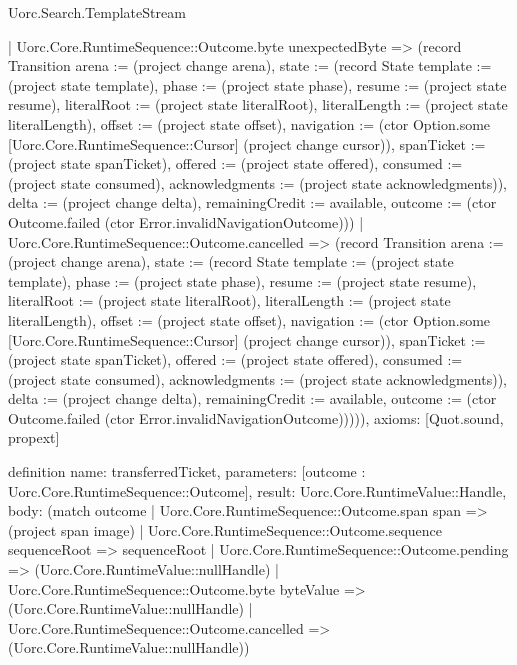 \begin{lexlean}{Uorc.Search.TemplateStream}
\begin{semanticmodule}
{      | Uorc.Core.RuntimeSequence::Outcome.byte unexpectedByte => (record Transition {arena := (project change arena), state := (record State {template := (project state template), phase := (project state phase), resume := (project state resume), literalRoot := (project state literalRoot), literalLength := (project state literalLength), offset := (project state offset), navigation := (ctor Option.some [Uorc.Core.RuntimeSequence::Cursor] (project change cursor)), spanTicket := (project state spanTicket), offered := (project state offered), consumed := (project state consumed), acknowledgments := (project state acknowledgments)}), delta := (project change delta), remainingCredit := available, outcome := (ctor Outcome.failed (ctor Error.invalidNavigationOutcome))})
      | Uorc.Core.RuntimeSequence::Outcome.cancelled => (record Transition {arena := (project change arena), state := (record State {template := (project state template), phase := (project state phase), resume := (project state resume), literalRoot := (project state literalRoot), literalLength := (project state literalLength), offset := (project state offset), navigation := (ctor Option.some [Uorc.Core.RuntimeSequence::Cursor] (project change cursor)), spanTicket := (project state spanTicket), offered := (project state offered), consumed := (project state consumed), acknowledgments := (project state acknowledgments)}), delta := (project change delta), remainingCredit := available, outcome := (ctor Outcome.failed (ctor Error.invalidNavigationOutcome))}))),
  axioms: [Quot.sound, propext]
}

definition{
  name: transferredTicket,
  parameters: [outcome : Uorc.Core.RuntimeSequence::Outcome],
  result: Uorc.Core.RuntimeValue::Handle,
  body: (match outcome
    | Uorc.Core.RuntimeSequence::Outcome.span span => (project span image)
    | Uorc.Core.RuntimeSequence::Outcome.sequence sequenceRoot => sequenceRoot
    | Uorc.Core.RuntimeSequence::Outcome.pending => (Uorc.Core.RuntimeValue::nullHandle)
    | Uorc.Core.RuntimeSequence::Outcome.byte byteValue => (Uorc.Core.RuntimeValue::nullHandle)
    | Uorc.Core.RuntimeSequence::Outcome.cancelled => (Uorc.Core.RuntimeValue::nullHandle))
}


\end{semanticmodule}
\end{lexlean}
